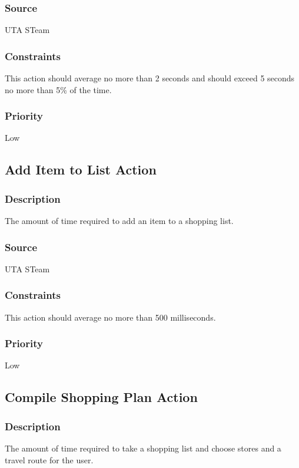 \subsubsection{Source}
UTA STeam
\subsubsection{Constraints}
This action should average no more than 2 seconds and should exceed 5 seconds no more than 5\% of the time.
\subsubsection{Priority}
Low

\subsection{Add Item to List Action}
\subsubsection{Description}
The amount of time required to add an item to a shopping list.
\subsubsection{Source}
UTA STeam
\subsubsection{Constraints}
This action should average no more than 500 milliseconds.
\subsubsection{Priority}
Low

\subsection{Compile Shopping Plan Action}
\subsubsection{Description}
The amount of time required to take a shopping list and choose stores and a travel route for the user.
